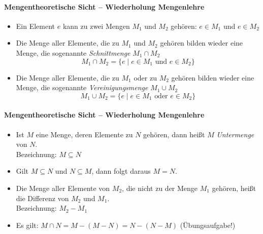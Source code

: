 \begin{frame}{\insertsection}
\framesubtitle{Mengentheoretische Sicht -- Wiederholung Mengenlehre}
\begin{itemize}
	\onslide 
	\item Ein Element $e$ kann zu zwei Mengen $M_1$ und $M_2$ geh\"oren: $e\in M_1$ und $e\in M_2$\\[4pt]	
	\pause 
	\item Die Menge aller Elemente, die zu $M_1$ und $M_2$ geh\"oren bilden wieder eine Menge, die sogenannte \emph{Schnittmenge} 
	$M_1\cap M_2$
	\begin{equation*}
	M_1\cap M_2=\{ e\mid e\in M_1\text{ und } e\in M_2\}
	\end{equation*}
	\pause
	\item Die Menge aller Elemente, die zu $M_1$ oder zu $M_2$ geh\"oren bilden wieder eine Menge, die sogenannte \emph{Vereinigungsmenge}
	$M_1\cup M_2$
	\begin{equation*}
	M_1\cup M_2=\{ e\mid e\in M_1\text{ oder } e\in M_2\}
	\end{equation*}
\end{itemize}
\end{frame}

\begin{frame}{\insertsection}
\framesubtitle{Mengentheoretische Sicht -- Wiederholung Mengenlehre}
\begin{itemize}
\onslide 
\item Ist $M$ eine Menge, deren Elemente zu $N$ geh\"oren, dann hei\ss t $M$ \emph{Untermenge} von $N$.\\[4pt]
Bezeichnung: $M\subseteq N$\\[8pt]
\pause
\item Gilt $M\subseteq N$ und $N\subseteq M$, dann folgt daraus $M=N$.\\[8pt]
\pause
\item
Die Menge aller Elemente von $M_2$, die nicht zu der Menge $M_1$ geh\"oren, hei\ss t die Differenz von $M_2$ und $M_1$.\\[4pt]
Bezeichnung: $M_2 - M_1$\\[8pt]
\pause
\item Es gilt: $M\cap N = M - (M - N) = N- (N - M)$ (\"Ubungsaufgabe!)
\end{itemize}
\end{frame}

